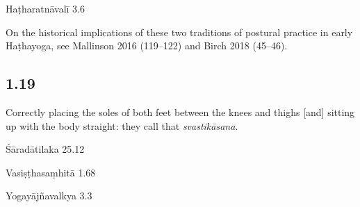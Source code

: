 \begin{ekdosis}
\begin{testimonia}[hp01_018]
Haṭharatnāvalī 3.6

\begin{versinnote}
\end{versinnote}

\end{testimonia}

\begin{philcomm}[hp01_018]        
On the historical implications of these two traditions of postural practice in early Haṭhayoga, see Mallinson 2016 (119–122) and Birch 2018 (45–46).
\end{philcomm}

\subsection*{1.19}
\begin{translation}[hp01_019]
Correctly placing the soles of both feet between the knees and thighs [and] sitting up with the body straight: they call that \emph{svastikāsana}.
\end{translation}

\begin{sources}[hp01_019]
Śāradātilaka 25.12

\begin{versinnote}
\end{versinnote}

Vasiṣṭhasaṃhitā 1.68

\begin{versinnote}
\end{versinnote}

Yogayājñavalkya 3.3

\begin{versinnote}
\end{versinnote}


\end{sources}
\end{ekdosis}
